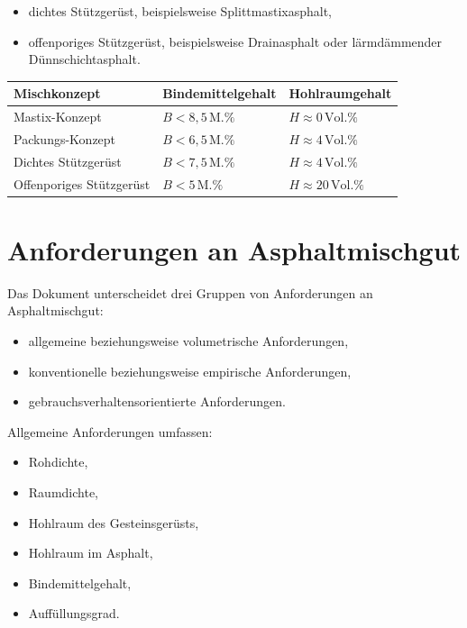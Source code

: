 \documentclass[
  12pt,
  a4paper,
  oneside
]{scrreprt}
\begin{document}
\begin{itemize}
  \item dichtes Stützgerüst, beispielsweise Splittmastixasphalt,
  \item offenporiges Stützgerüst, beispielsweise Drainasphalt oder
  lärmdämmender Dünnschichtasphalt.
\end{itemize}



\begin{longtable}{
  >{\raggedright\arraybackslash}p{}
  >{\centering\arraybackslash}p{}
  >{\centering\arraybackslash}p{}
}
\toprule
\textbf{Mischkonzept} &
\textbf{Bindemittelgehalt} &
\textbf{Hohlraumgehalt} \\
\midrule
\endhead

Mastix-Konzept &
$B < 8{,}5\,\mathrm{M.\%}$ &
$H \approx 0\,\mathrm{Vol.\%}$ \\

Packungs-Konzept &
$B < 6{,}5\,\mathrm{M.\%}$ &
$H \approx 4\,\mathrm{Vol.\%}$ \\

Dichtes Stützgerüst &
$B < 7{,}5\,\mathrm{M.\%}$ &
$H \approx 4\,\mathrm{Vol.\%}$ \\

Offenporiges Stützgerüst &
$B < 5\,\mathrm{M.\%}$ &
$H \approx 20\,\mathrm{Vol.\%}$ \\

\bottomrule
\end{longtable}



\section{Anforderungen an Asphaltmischgut}

Das Dokument unterscheidet drei Gruppen von Anforderungen an
Asphaltmischgut:

\begin{itemize}
  \item allgemeine beziehungsweise volumetrische Anforderungen,
  \item konventionelle beziehungsweise empirische Anforderungen,
  \item gebrauchsverhaltensorientierte Anforderungen.
\end{itemize}



Allgemeine Anforderungen umfassen:

\begin{itemize}
  \item Rohdichte,
  \item Raumdichte,
  \item Hohlraum des Gesteinsgerüsts,
  \item Hohlraum im Asphalt,
  \item Bindemittelgehalt,
  \item Auffüllungsgrad.
\end{itemize}
\end{document}
